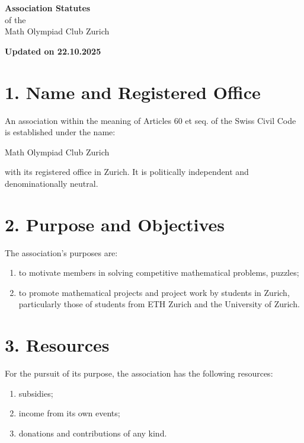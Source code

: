\documentclass[11pt,a4paper]{article}
\begin{document}
\begin{center}
    \LARGE\textbf{Association Statutes} \\
    \small{of the} \\
    \large{Math Olympiad Club Zurich}

    \vspace{0.5cm}
    \textbf{Updated on 22.10.2025}
\end{center}

\vspace{1cm}

\section*{1. Name and Registered Office}

An association within the meaning of Articles 60 et seq. of the Swiss Civil Code is established under the name:
\begin{center}
    Math Olympiad Club Zurich
\end{center}
with its registered office in Zurich. It is politically independent and denominationally neutral.

\section*{2. Purpose and Objectives}

The association's purposes are:

\begin{enumerate}
    \item to motivate members in solving competitive mathematical problems, puzzles;
    \item to promote mathematical projects and project work by students in Zurich, particularly those of students from ETH Zurich and the University of Zurich.
\end{enumerate}

\section*{3. Resources}

For the pursuit of its purpose, the association has the following resources:

\begin{enumerate}
    \item subsidies;
    \item income from its own events;
    \item donations and contributions of any kind.
\end{enumerate}
\end{document}
